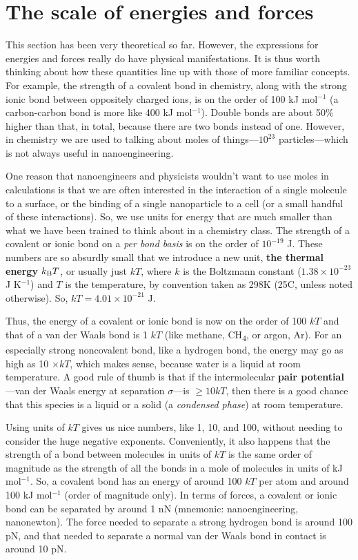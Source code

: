 \section{The scale of energies and forces}

This section has been very theoretical so far. However, the expressions for energies and forces really do have physical manifestations. It is thus worth thinking about how these quantities line up with those of more familiar concepts. For example, the strength of a covalent bond in chemistry, along with the strong ionic bond between oppositely charged ions, is on the order of 100 kJ mol$^{-1}$ (a carbon-carbon bond is more like 400 kJ  mol$^{-1}$). Double bonds are about 50\% higher than that, in total, because there are two bonds instead of one. However, in chemistry we are used to talking about moles of things---$10^{23}$ particles---which is not always useful in nanoengineering. 

One reason that nanoengineers and physicists wouldn't want to use moles in calculations is that we are often interested in the interaction of a single molecule to a surface, or the binding of a single nanoparticle to a cell (or a small handful of these interactions). So, we use units for energy that are much smaller than what we have been trained to think about in a chemistry class. The strength of a covalent or ionic bond on a \textit{per bond basis} is on the order of $10^{-19}$ J. These numbers are so absurdly small that we introduce a new unit, \textbf{the thermal energy} $k\textsubscript{B}T$, or usually just $kT$, where $k$ is the Boltzmann constant ($1.38\times10^{-23}$ J K$^{-1}$) and $T$ is the temperature, by convention taken as 298K (25\degree C, unless noted otherwise). So, $kT=4.01\times10^{-21}$ J. 

Thus, the energy of a covalent or ionic bond is now on the order of 100 $kT$ and that of a van der Waals bond is 1 $kT$ (like methane, CH\textsubscript{4}, or argon, Ar). For an especially strong noncovalent bond, like a hydrogen bond, the energy may go as high as 10 $\times kT$, which makes sense, because water is a liquid at room temperature. A good rule of thumb is that if the intermolecular \textbf{pair potential}---van der Waals energy at separation $\sigma$---is $\geq 10 kT$, then there is a good chance that this species is a liquid or a solid (a \textit{condensed phase}) at room temperature. 

Using units of $kT$ gives us nice numbers, like 1, 10, and 100, without needing to consider the huge negative exponents. Conveniently, it also happens that the strength of a bond between molecules in units of $kT$ is the same order of magnitude as the strength of all the bonds in a mole of molecules in units of kJ mol$^{-1}$. So, a covalent bond has an energy of around 100 $kT$ per atom and around 100 kJ mol$^{-1}$ (order of magnitude only). In terms of forces, a covalent or ionic bond can be separated by around 1 nN (mnemonic: nanoengineering, nanonewton). The force needed to separate a strong hydrogen bond is around 100 pN, and that needed to separate a normal van der Waals bond in contact is around 10 pN.

